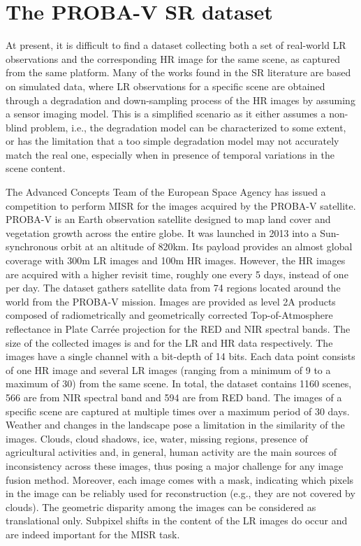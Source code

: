 \documentclass[journal]{IEEEtran}
\begin{document}
\section{The PROBA-V SR dataset}
\label{sec:challenge}

At present, it is difficult to find a dataset collecting both a set of real-world LR observations and the corresponding HR image for the same scene, as captured from the same platform. Many of the works found in the SR literature are based on simulated data, where LR observations for a specific scene are obtained through a degradation and down-sampling process of the HR images by assuming a sensor imaging model. This is a simplified scenario as it either assumes a non-blind problem, i.e., the degradation model can be characterized to some extent, or has the limitation that a too simple degradation model may not accurately match the real one, especially when in presence of temporal variations in the scene content.

The Advanced Concepts Team of the European Space Agency has issued a competition \cite{2019arXiv190701821M} to perform MISR for the images acquired by the PROBA-V satellite. PROBA-V is an Earth observation satellite designed to map land cover and vegetation growth across the entire globe. It was launched in 2013 into a Sun-synchronous orbit at an altitude of 820km. Its payload provides an almost global coverage with 300m LR images and 100m HR images. However, the HR images are acquired with a higher revisit time, roughly one every 5 days, instead of one per day. The dataset gathers satellite data from 74 regions located around the world from the PROBA-V mission. Images are provided as level 2A products composed of radiometrically and geometrically corrected Top-of-Atmosphere reflectance in Plate Carrée projection for the RED and NIR spectral bands. The size of the collected images is  and  for the LR and HR data respectively. The images have a single channel with a bit-depth of 14 bits. Each data point consists of one HR image and several LR images (ranging from a minimum of 9 to a maximum of 30) from the same scene. In total, the dataset contains 1160 scenes, 566 are from NIR spectral band and 594 are from RED band. 
The images of a specific scene are captured at multiple times over a maximum period of 30 days. Weather and changes in the landscape pose a limitation in the similarity of the images. Clouds, cloud shadows, ice, water, missing regions, presence of agricultural activities and, in general, human activity are the main sources of inconsistency across these images, thus posing a major challenge for any image fusion method.
Moreover, each image comes with a mask, indicating which pixels in the image can be reliably used for reconstruction (e.g., they are not covered by clouds).
The geometric disparity among the images can be considered as translational only. Subpixel shifts in the content of the LR images do occur and are indeed important for the MISR task.
\end{document}
